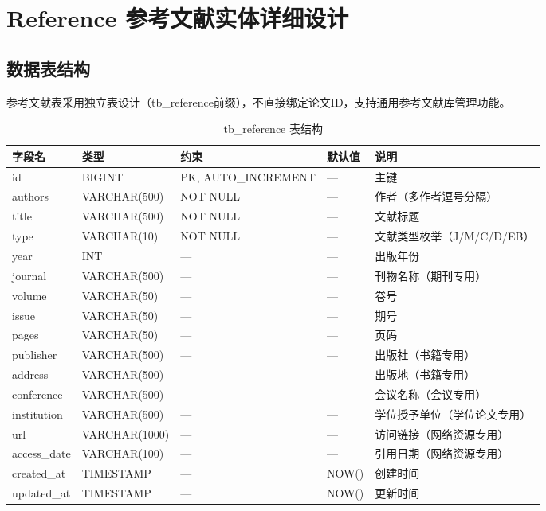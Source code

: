 
\section{Reference 参考文献实体详细设计}

\subsection{数据表结构}

参考文献表采用独立表设计（tb\_reference前缀），不直接绑定论文ID，支持通用参考文献库管理功能。

\begin{table}[htbp]
\centering
\caption{tb\_reference 表结构}
\label{tab:tb_reference}
\begin{tabular}{lllll}
\toprule
\textbf{字段名} & \textbf{类型} & \textbf{约束} & \textbf{默认值} & \textbf{说明} \\
\midrule
id          & BIGINT    & PK, AUTO\_INCREMENT & —      & 主键 \\
authors     & VARCHAR(500) & NOT NULL        & —      & 作者（多作者逗号分隔）\\
title       & VARCHAR(500) & NOT NULL        & —      & 文献标题 \\
type        & VARCHAR(10)  & NOT NULL        & —      & 文献类型枚举（J/M/C/D/EB）\\
year        & INT       & —                & —      & 出版年份 \\
journal     & VARCHAR(500) & —                & —      & 刊物名称（期刊专用）\\
volume      & VARCHAR(50)  & —                & —      & 卷号 \\
issue       & VARCHAR(50)  & —                & —      & 期号 \\
pages       & VARCHAR(50)  & —                & —      & 页码 \\
publisher   & VARCHAR(500) & —                & —      & 出版社（书籍专用）\\
address     & VARCHAR(500) & —                & —      & 出版地（书籍专用）\\
conference  & VARCHAR(500) & —                & —      & 会议名称（会议专用）\\
institution & VARCHAR(500) & —                & —      & 学位授予单位（学位论文专用）\\
url         & VARCHAR(1000)& —                & —      & 访问链接（网络资源专用）\\
access\_date & VARCHAR(100) & —                & —      & 引用日期（网络资源专用）\\
created\_at  & TIMESTAMP  & —                & NOW()  & 创建时间 \\
updated\_at  & TIMESTAMP  & —                & NOW()  & 更新时间 \\
\bottomrule
\end{tabular}
\end{table}

